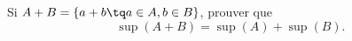 
\begin{exercice}\label{exo00035}
Si $A+B=\{ a+b\tq a\in A,b\in B \}$, prouver que
\begin{equation}
	\sup(A+B)=\sup(A)+\sup(B).
\end{equation}
\end{exercice}
